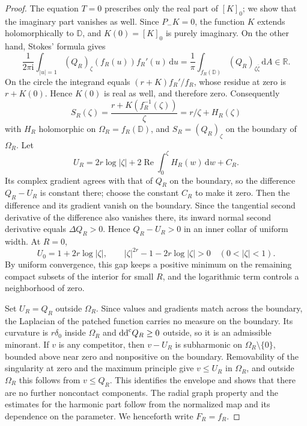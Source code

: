 \begin{proof}
The equation $T=0$ prescribes only the real part of $[K]_0$; we show that the imaginary part vanishes as well. Since $P_-K=0$, the function $K$ extends holomorphically to $\mathbb D$, and $K(0)=[K]_0$ is purely imaginary. On the other hand, Stokes' formula gives
\[
 \frac1{2\pi\mathrm{i}}\int_{|u|=1}(Q_R)_\zeta(f_R(u))f_R'(u)\,\mathrm{d}u
 =\frac1\pi\int_{f_R(\mathbb D)}(Q_R)_{\zeta\bar\zeta}\,\mathrm{d}A\in\mathbb R.
\]
On the circle the integrand equals $(r+K)f_R'/f_R$, whose residue at zero is $r+K(0)$. Hence $K(0)$ is real as well, and therefore zero. Consequently
\[
 S_R(\zeta)=\frac{r+K(f_R^{-1}(\zeta))}{\zeta}
 =r/\zeta+H_R(\zeta)
\]
with $H_R$ holomorphic on $\Omega_R=f_R(\mathbb D)$, and $S_R=(Q_R)_\zeta$ on the boundary of $\Omega_R$. Let
\[
 U_R=2r\log|\zeta|+2\operatorname{Re}\int_0^\zeta H_R(w)\,\mathrm{d}w+C_R.
\]
Its complex gradient agrees with that of $Q_R$ on the boundary, so the difference $Q_R-U_R$ is constant there; choose the constant $C_R$ to make it zero. Then the difference and its gradient vanish on the boundary. Since the tangential second derivative of the difference also vanishes there, its inward normal second derivative equals $\Delta Q_R>0$. Hence $Q_R-U_R>0$ in an inner collar of uniform width. At $R=0$,
\[
 U_0=1+2r\log|\zeta|,\qquad
 |\zeta|^{2r}-1-2r\log|\zeta|>0\quad(0<|\zeta|<1).
\]
By uniform convergence, this gap keeps a positive minimum on the remaining compact subsets of the interior for small $R$, and the logarithmic term controls a neighborhood of zero.

Set $U_R=Q_R$ outside $\Omega_R$. Since values and gradients match across the boundary, the Laplacian of the patched function carries no measure on the boundary. Its curvature is $r\delta_0$ inside $\Omega_R$ and $\mathrm{dd}^{\mathrm{c}} Q_R\geq0$ outside, so it is an admissible minorant. If $v$ is any competitor, then $v-U_R$ is subharmonic on $\Omega_R\setminus\{0\}$, bounded above near zero and nonpositive on the boundary. Removability of the singularity at zero and the maximum principle give $v\leq U_R$ in $\Omega_R$, and outside $\Omega_R$ this follows from $v\leq Q_R$. This identifies the envelope and shows that there are no further noncontact components. The radial graph property and the estimates for the harmonic part follow from the normalized map and its dependence on the parameter. We henceforth write $F_R=f_R$.
\end{proof}


